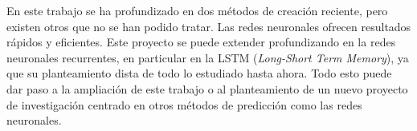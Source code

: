 \documentclass[12pt,twoside]{article}
\begin{document}
En este trabajo se ha profundizado en dos métodos de creación reciente, pero existen otros que no se han podido tratar. Las redes neuronales ofrecen resultados rápidos y eficientes. Este proyecto se puede extender profundizando en la redes neuronales recurrentes, en particular en la LSTM (\emph{Long-Short Term Memory}), ya que su planteamiento dista de todo lo estudiado hasta ahora. Todo esto puede dar paso a la ampliación de este trabajo o al planteamiento de un nuevo proyecto de investigación centrado en otros métodos de predicción como las redes neuronales.









\end{document}

